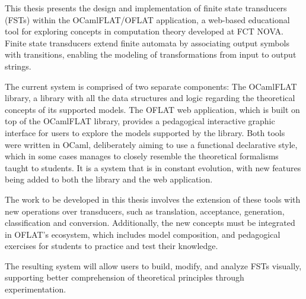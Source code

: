 
%

This thesis presents the design and implementation of finite state transducers (FSTs) within the OCamlFLAT/OFLAT application, 
a web-based educational tool for exploring concepts in computation theory developed at FCT NOVA. 
Finite state transducers extend finite automata by associating output symbols with transitions, 
enabling the modeling of transformations from input to output strings. 

The current system is comprised of two separate components:
The OCamlFLAT library, a library with all the data structures and logic regarding the theoretical concepts of its supported models.
The OFLAT web application, which is built on top of the OCamlFLAT library, provides a pedagogical interactive graphic interface 
for users to explore the models supported by the library.
Both tools were written in OCaml, deliberately aiming to use a functional declarative style, 
which in some cases manages to closely resemble the theoretical formalisms taught to students.
It is a system that is in constant evolution, with new features being added to both the library and the web application.

The work to be developed in this thesis involves the extension of these tools with new operations over transducers, 
such as translation, acceptance, generation, classification and conversion.
Additionally, the new concepts must be integrated in OFLAT's ecosystem, which includes model composition,
and pedagogical exercises for students to practice and test their knowledge.

The resulting system will allow users to build, modify, and analyze FSTs visually, 
supporting better comprehension of theoretical principles through experimentation.
